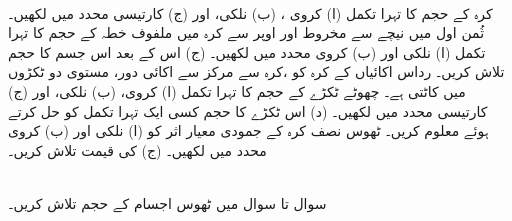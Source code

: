\\
کرہ  کے حجم کا تہرا تکمل (ا) کروی ، (ب) نلکی، اور (ج) کارتیسی محدد میں لکھیں۔
ثُمن اول میں نیچے سے مخروط  اور اوپر سے کرہ  میں ملفوف خطہ  کے حجم کا تہرا تکمل (ا) نلکی اور  (ب) کروی محدد میں لکھیں۔ (ج)  اس کے بعد اس جسم کا حجم تلاش کریں۔
رداس  اکائیاں   کے کرہ کو ،کرہ سے مرکز سے  اکائی دور، مستوی دو ٹکڑوں میں کاٹتی ہے۔  چھوٹے ٹکڑے  کے حجم کا تہرا تکمل (ا) کروی، (ب) نلکی، اور (ج) کارتیسی محدد میں لکھیں۔ (د) اس ٹکڑے کا حجم کسی ایک تہرا تکمل کو حل کرتے ہوئے   معلوم کریں۔
ٹھوس نصف کرہ  کے جمودی معیار اثر  کو (ا) نلکی اور (ب) کروی محدد میں لکھیں۔ (ج)  کی قیمت تلاش کریں۔

\\
سوال  تا سوال  میں ٹھوس اجسام کے حجم تلاش کریں۔

